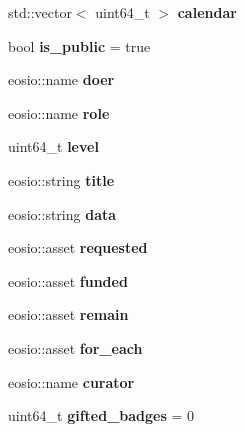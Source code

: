 \begin{DoxyCompactItemize}
std\+::vector$<$ uint64\+\_\+t $>$ {\bfseries calendar}
\item 
\mbox{\label{structtasks_ab67682b429b14eb0102cbabf586f2542}} 
bool {\bfseries is\+\_\+public} = true
\item 
\mbox{\label{structtasks_a121059b007ee63fa8a842c150bf60251}} 
eosio\+::name {\bfseries doer}
\item 
\mbox{\label{structtasks_aabceb8533e216dc89e10f9e39acabb1a}} 
eosio\+::name {\bfseries role}
\item 
\mbox{\label{structtasks_ad2511db83c6b290650c578a77090ed17}} 
uint64\+\_\+t {\bfseries level}
\item 
\mbox{\label{structtasks_a257a4c8ae9272a001f91c51e62a1953a}} 
eosio\+::string {\bfseries title}
\item 
\mbox{\label{structtasks_a4e816d6457e29a0623a3f5bcfab21e4c}} 
eosio\+::string {\bfseries data}
\item 
\mbox{\label{structtasks_a370f9d2c835740238fd90bf40d647574}} 
eosio\+::asset {\bfseries requested}
\item 
\mbox{\label{structtasks_acb852d91b0fc4f5d1bbef0fdf2d0222c}} 
eosio\+::asset {\bfseries funded}
\item 
\mbox{\label{structtasks_a367e96715a0e358b43c44350d258e5b1}} 
eosio\+::asset {\bfseries remain}
\item 
\mbox{\label{structtasks_a92fa22fac621633ab15e080641dc840d}} 
eosio\+::asset {\bfseries for\+\_\+each}
\item 
\mbox{\label{structtasks_adf167668b34739293125f4d95b5c6d4e}} 
eosio\+::name {\bfseries curator}
\item 
\mbox{\label{structtasks_aa30ffbcf360d9696a964680178b14c50}} 
uint64\+\_\+t {\bfseries gifted\+\_\+badges} = 0
\item 
\mbox{\label{structtasks_a36d2f565b26fd32d54b106bf0d1215b9}} 

\end{DoxyCompactItemize}

